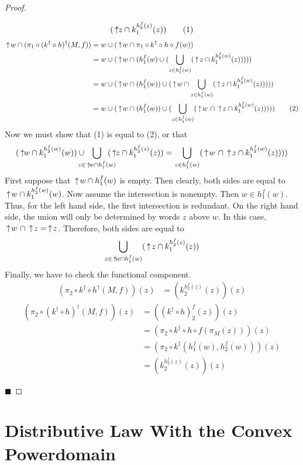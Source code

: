 \begin{proof}
\begin{description}
\begin{align*}
(\,\uparrow\!\! z \cap k_{1}^{h_{2}^{f}(z)}(z))\tag{1}
\end{align*}
\begin{align*}
\ua w\cap (\pi_1\circ (k^\dagger\circ h)^\dagger (M,f))
&= w\cup(\ua w\cap \pi_1\circ k^\dagger\circ h\circ f(w)) \\
&= w\cup(\ua w\cap (h_1^f(w) \cup (\bigcup_{z\in h_1^f(w)}(\ua z\cap k_1^{h_2^f(w)}(z))))) \\
&= w\cup(\ua w\cap (h_1^f(w)) \cup (\ua w \cap \bigcup_{z\in h_1^f(w)}(\ua z\cap k_1^{h_2^f(w)}(z))))) \\
&= w\cup(\ua w\cap (h_1^f(w)) \cup (\bigcup_{z\in h_1^f(w)}(\ua w\  \cap \ua z\cap k_1^{h_2^f(w)}(z))))) \tag{2}
\end{align*}
Now we must show that (1) is equal to (2), or that
\[
(\ua\! w \cap k_{1}^{h_{2}^{f}(w)}(w))\cup\!\!\!\!\!\!\bigcup_{z\in \ua w \cap h^{f}_{1}(w)}\!\!\!\!\!\! 
(\ua\! z \cap k_{1}^{h_{2}^{f}(z)}(z)) = 
\bigcup_{z\in h_1^f(w)}(\ua w\  \cap \ua z\cap k_1^{h_2^f(w)}(z))))
\]
First suppose that $\,\uparrow\! w \cap h^{f}_{1}(w)$ is empty.  Then clearly, both sides are equal to $\,\uparrow\! w \cap k_{1}^{h_{2}^{f}(w)}(w)$.  Now assume the intersection is nonempty.  Then $w \in h^{f}_{1}(w)$.  Thus, for the left hand side, the first intersection is redundant.  On the right hand side, the union will only be determined by words $z$ above $w$.  In this case, $\,\uparrow\! w\ \cap \,\uparrow\! z = \,\uparrow\! z$.  Therefore, both sides are equal to 
\[\bigcup_{z\in \,\uparrow\! w \cap h^{f}_{1}(w)} 
(\,\uparrow\! z \cap k_{1}^{h_{2}^{f}(z)}(z))
\]
Finally, we have to check the functional component.
\begin{align*}
(\pi_2\circ k^\dagger\circ h^\dagger(M,f))(z) &= (k_2^{h_2^f(z)}(z))(z)
\end{align*}
\begin{align*}
(\pi_2\circ (k^\dagger\circ h)^\dagger(M,f))(z) &= ((k^\dagger\circ h)_2^f(z))(z) \\
&= (\pi_2\circ k^\dagger\circ h\circ f(\pi_M(z)))(z) \\
&= (\pi_2\circ k^\dagger(h_1^f(w),h_2^f(w)))(z) \\
&= (k_2^{h_2^f(z)}(z))(z)
\end{align*} 
\end{description}\hfill $\blacksquare$
\end{proof}

\section{Distributive Law With the Convex Powerdomain}

